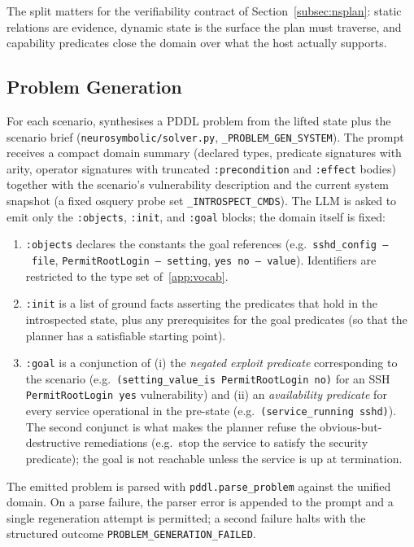 The split matters for the verifiability contract of Section~\ref{subsec:nsplan}: static relations are evidence, dynamic state is the surface the plan must traverse, and capability predicates close the domain over what the host actually supports.

\subsection{Problem Generation}
\label{app:problem}

For each scenario, \nsplan synthesises a PDDL problem from the lifted state plus the scenario brief (\texttt{neurosymbolic/solver.py}, \texttt{\_PROBLEM\_GEN\_SYSTEM}). The prompt receives a compact domain summary (declared types, predicate signatures with arity, operator signatures with truncated \texttt{:precondition} and \texttt{:effect} bodies) together with the scenario's vulnerability description and the current system snapshot (a fixed osquery probe set \texttt{\_INTROSPECT\_CMDS}). The LLM is asked to emit only the \texttt{:objects}, \texttt{:init}, and \texttt{:goal} blocks; the domain itself is fixed:

\begin{enumerate}
  \item \texttt{:objects} declares the constants the goal references (e.g.\ \texttt{sshd\_config~--~file}, \texttt{PermitRootLogin~--~setting}, \texttt{yes no~--~value}). Identifiers are restricted to the type set of~\ref{app:vocab}.
  \item \texttt{:init} is a list of ground facts asserting the predicates that hold in the introspected state, plus any prerequisites for the goal predicates (so that the planner has a satisfiable starting point).
  \item \texttt{:goal} is a conjunction of (i) the \emph{negated exploit predicate} corresponding to the scenario (e.g.\ \texttt{(setting\_value\_is PermitRootLogin no)} for an SSH \texttt{PermitRootLogin yes} vulnerability) and (ii) an \emph{availability predicate} for every service operational in the pre-state (e.g.\ \texttt{(service\_running sshd)}). The second conjunct is what makes the planner refuse the obvious-but-destructive remediations (e.g.\ stop the service to satisfy the security predicate); the goal is not reachable unless the service is up at termination.
\end{enumerate}

The emitted problem is parsed with \texttt{pddl.parse\_problem} against the unified domain. On a parse failure, the parser error is appended to the prompt and a single regeneration attempt is permitted; a second failure halts \nsplan with the structured outcome \texttt{PROBLEM\_GENERATION\_FAILED}.


